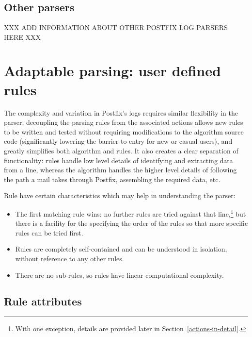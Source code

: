 \documentclass[a4paper,12pt,draft]{article}
\begin{document}
\subsection{Other parsers}

XXX ADD INFORMATION ABOUT OTHER POSTFIX LOG PARSERS HERE XXX



\section{Adaptable parsing: user defined rules}

The complexity and variation in Postfix's logs requires similar flexibility
in the parser; decoupling the parsing rules from the associated actions
allows new rules to be written and tested without requiring modifications
to the algorithm source code (significantly lowering the barrier to entry
for new or casual users), and greatly simplifies both algorithm and rules.
It also creates a clear separation of functionality: rules handle low level
details of identifying and extracting data from a line, whereas the
algorithm handles the higher level details of following the path a mail
takes through Postfix, assembling the required data, etc.

Rule have certain characteristics which may help in understanding the
parser:

\begin{itemize}

    \item The first matching rule wins: no further rules are tried against
        that line,\footnote{With one exception, details are provided later
        in Section~\ref{actions-in-detail}.} but there is a facility for
        the specifying the order of the rules so that more specific rules
        can be tried first.

    \item Rules are completely self-contained and can be understood in
        isolation, without reference to any other rules.

    \item There are no sub-rules, so rules have linear computational
        complexity.

\end{itemize}

\subsection{Rule attributes}
\end{document}
